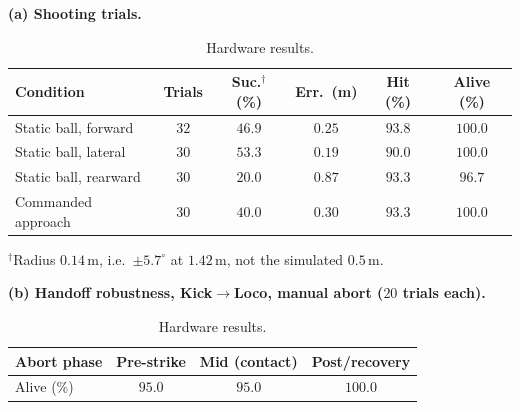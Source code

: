 \documentclass[letterpaper, 10 pt, conference]{ieeeconf}  %
\begin{document}
\begin{table}[t]
\centering
\caption{Hardware results.}
\label{tab:hardware}
\scriptsize
\setlength{\tabcolsep}{3pt}

\textbf{(a) Shooting trials.}\\[2pt]
\begin{tabular}{@{}lccccc@{}}
\toprule
Condition & Trials & Suc.$^\dagger$ (\%) & Err.\ (m) & Hit (\%) & Alive (\%) \\
\midrule
Static ball, forward  & $32$ & $46.9$ & $0.25$ & $93.8$ & $100.0$ \\
Static ball, lateral  & $30$ & $53.3$ & $0.19$ & $90.0$ & $100.0$ \\
Static ball, rearward & $30$ & $20.0$ & $0.87$ & $93.3$ & $96.7$  \\
Commanded approach    & $30$ & $40.0$ & $0.30$ & $93.3$ & $100.0$ \\
\bottomrule
\end{tabular}

{\scriptsize $^{\dagger}$Radius $0.14$\,m, i.e.\ $\pm5.7^\circ$ at $1.42$\,m,
not the simulated $0.5$\,m.}

\vspace{2pt}
\textbf{(b) Handoff robustness, Kick$\to$Loco, manual abort ($20$ trials
each).}\\[2pt]
\begin{tabular}{@{}lccc@{}}
\toprule
Abort phase & Pre-strike & Mid (contact) & Post/recovery \\
\midrule
Alive (\%) & $95.0$ & $95.0$ & $100.0$ \\
\bottomrule
\end{tabular}

\end{table}
\end{document}
